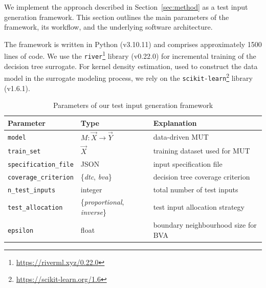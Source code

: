 \documentclass[
]{ceurart}
\theoremstyle{definition}
\begin{document}
We implement the approach described in Section~\ref{sec:method} as a test input generation framework. This section outlines the main parameters of the framework, its workflow, and the underlying software architecture.

The framework is written in Python (v3.10.11) and comprises approximately 1500 lines of code. We use the \lstinline{river}\footnote{\url{https://riverml.xyz/0.22.0}} library (v0.22.0) for incremental training of the decision tree surrogate. For kernel density estimation, used to construct the data model in the surrogate modeling process, we rely on the \lstinline{scikit-learn}\footnote{\url{https://scikit-learn.org/1.6}} library (v1.6.1).

\begin{table}
\caption{Parameters of our test input generation framework}
\label{tab:parameters}
\begin{tabular}{lll}\toprule
Parameter & Type & Explanation \\\midrule
\lstinline{model}                    &   $M: \vec{X} \rightarrow \vec{Y}$ & data-driven MUT  \\
\lstinline{train_set}                 &  $\vec{X}$ & training dataset used for MUT \\
\lstinline{specification_file}     &  JSON & input specification file  \\
\lstinline{coverage_criterion}  &  \{\textit{dtc}, \textit{bva}\}& decision tree coverage criterion  \\
\lstinline{n_test_inputs}           & integer & total number of test inputs  \\
\lstinline{test_allocation}        &  \{\textit{proportional}, \textit{inverse}\} & test input allocation strategy   \\
\lstinline{epsilon}                   &  float & boundary neighbourhood size for BVA  \\\bottomrule
\end{tabular}
\end{table}
\end{document}
